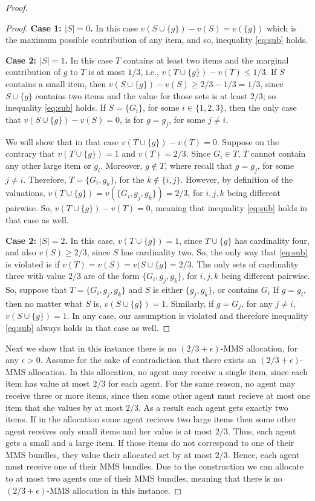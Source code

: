 \begin{proof}
\begin{proof}
    {\bf Case 1: $|S|=0$.} In this case $v(S\cup \{g\})-v(S)=v(\{g\})$ which is the maximum possible contribution of any item,  and so, inequality \ref{eq:sub} holds.

    {\bf Case 2: $|S|=1$.} In this case $T$ contains at least two items and the marginal contribution of $g$ to $T$ is at most $1/3$, i.e., $v(T \cup \{g\}) - v(T) \le 1/3$. If $S$ contains a small item, then $v(S\cup\{g\})-v(S)\geq 2/3-1/3=1/3$, since $S\cup\{g\}$ contains two items and the value for those sets is at least $2/3$; so inequality \eqref{eq:sub} holds. If $S=\{G_i\}$, for some $i\in\{1,2,3\}$, then the only case that $v(S\cup\{g\})-v(S)=0$, is for $g=g_j$, for some $j\neq i$. 
    
    We will show that in that case $v(T \cup \{g\}) - v(T)=0$. Suppose on the contrary that $v(T \cup \{g\})=1$ and $v(T)=2/3$. Since $G_i\in T$, $T$ cannot contain any other large item or $g_i$. Moreover, $g\notin T$, where recall that $g=g_j$, for some $j\neq i$. Therefore, $T=\{G_i,g_k\}$, for the $k\notin\{i,j\}$. However, by definition of the valuations, $v(T \cup \{g\}) = v(\{G_i,g_j,g_k\})=2/3$, for $i,j,k$ being different pairwise. So,  $v(T \cup \{g\}) - v(T)=0$, meaning that inequality \eqref{eq:sub} holds in that case as well.   

    {\bf Case 2: $|S|=2$.} In this case, $v(T \cup \{g\})=1$, since $T \cup \{g\}$ has cardinality four, and also $v(S)\geq 2/3$, since $S$ has cardinality two. So, the only way that \eqref{eq:sub} is violated is if $v(T)=v(S)=v(S\cup\{g\}=2/3$. The only sets of cardinality three with value $2/3$ are of the form $\{G_i,g_j,g_k\}$, for $i,j,k$ being different pairwise. So, suppose that $T=\{G_i,g_j,g_k\}$ and $S$ is either $\{g_j,g_k\}$, or contains $G_i$ If $g=g_i$, then no matter what $S$ is, $v(S\cup\{g\})=1$. Similarly, if $g=G_j$, for any $j\neq i$, $v(S\cup\{g\})=1$. In any case, our assumption is violated and therefore inequality \eqref{eq:sub} always holds in that case as well.  
    \end{proof}
    
    
    Next we show that in this instance there is no $(2/3+\epsilon)$-MMS allocation, for any $\epsilon>0$. Assume for the sake of contradiction that there exists an $(2/3+\epsilon)$-MMS allocation. In this allocation, no agent may receive a single item, since each item has value at most $2/3$ for each agent. For the same reason, no agent may receive three or more items, since then some other agent must recieve at most one item that she values by at most $2/3$. As a result each agent gets exactly two items. If in the allocation some agent recieves two large items then some other agent receives only small items and her value is at most $2/3$. Thus, each agent gets a small and a large item. If those items do not correspond to one of their MMS bundles, they value their allocated set by at most $2/3$. Hence, each agent must receive one of their MMS bundles. Due to the construction we can allocate to at most two agents one of their MMS bundles, meaning that there is no $(2/3+\epsilon)$-MMS allocation in this instance.
\end{proof}

